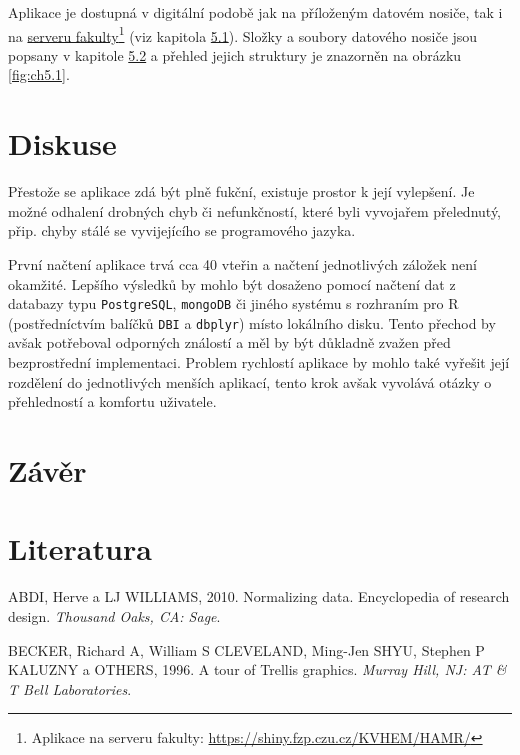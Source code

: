 \documentclass[12pt,]{article}
\let\rmarkdownfootnote\footnote%
\def\footnote{\protect\rmarkdownfootnote}
\begin{document}
\qquad Aplikace je dostupná v digitální podobě jak na příloženým datovém
nosiče, tak i na \href{https://shiny.fzp.czu.cz/KVHEM/HAMR/}{serveru
fakulty}\footnote{Aplikace na serveru fakulty:
  \url{https://shiny.fzp.czu.cz/KVHEM/HAMR/}} (viz kapitola
\protect\hyperlink{techres}{5.1}). Složky a soubory datového nosiče jsou
popsany v kapitole \protect\hyperlink{data}{5.2} a přehled jejich
struktury je znazorněn na obrázku \ref{fig:ch5.1}.

\newpage

\section*{Diskuse}\label{diskuse}

\qquad Přestože se aplikace zdá být plně fukční, existuje prostor k její
vylepšení. Je možné odhalení drobných chyb či nefunkčností, které byli
vyvojařem přelednutý, přip. chyby stálé se vyvijejícího se programového
jazyka.

\qquad První načtení aplikace trvá cca 40 vteřin a načtení jednotlivých
záložek není okamžité. Lepšího výsledků by mohlo být dosaženo pomocí
načtení dat z databazy typu \texttt{PostgreSQL}, \texttt{mongoDB} či
jiného systému s rozhraním pro R (postředníctvím balíčků \texttt{DBI} a
\texttt{dbplyr}) místo lokálního disku. Tento přechod by avšak
potřeboval odporných ználostí a měl by být důkladně zvažen před
bezprostřední implementaci. Problem rychlostí aplikace by mohlo také
vyřešit její rozdělení do jednotlivých menších aplikací, tento krok
avšak vyvolává otázky o přehledností a komfortu uživatele.

\newpage

\section*{Závěr}\label{zaver}

\newpage

\section{Literatura}\label{literatura}

\label{literatura}

\hypertarget{refs}{}
\hypertarget{ref-normalizing}{}
ABDI, Herve a LJ WILLIAMS, 2010. Normalizing data. Encyclopedia of
research design. \emph{Thousand Oaks, CA: Sage}.

\hypertarget{ref-trellisplot}{}
BECKER, Richard A, William S CLEVELAND, Ming-Jen SHYU, Stephen P KALUZNY
a OTHERS, 1996. A tour of Trellis graphics. \emph{Murray Hill, NJ: AT \&
T Bell Laboratories}.
\end{document}
